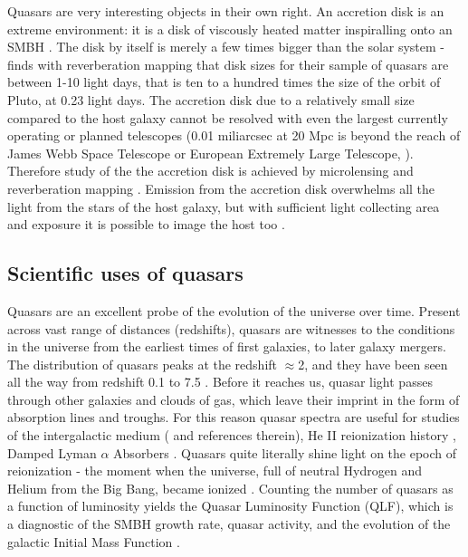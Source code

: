 \documentclass[modern]{aastex62}
\begin{document}
Quasars are very interesting objects in their own right. An accretion disk is an extreme environment: it is a disk of viscously heated matter inspiralling onto an SMBH \citep{ruan2017}. The disk by itself is merely a few times bigger than the solar system - \cite{mudd2017} finds with reverberation  mapping that disk sizes for their sample of quasars are between 1-10 light days, that is ten to a hundred times the size of the orbit of Pluto, at 0.23 light days. 
The accretion disk due to a relatively small size compared to the host galaxy cannot be resolved with even the largest currently operating or planned telescopes (0.01 miliarcsec at 20 Mpc is beyond the reach of James Webb Space Telescope or European Extremely Large Telescope, \cite{gardner2006,dioaliti2015}). Therefore study of the the accretion disk is achieved by microlensing \citep{agol1999, jimenez2012} and reverberation mapping \citep{jiang2017, mudd2017}.  Emission from the accretion disk overwhelms all the light from the stars of the host galaxy, but with sufficient light collecting area and exposure it is possible to image the host too \citep{hutchings2002,kotilainen2013, falomo2014, liuzzo2016, bayliss2017}. 

\subsection{Scientific uses of quasars}
Quasars are an excellent probe of the evolution of the universe over time. Present across vast range of distances (redshifts), quasars are witnesses to the conditions in the universe from the earliest times of first galaxies, to later galaxy mergers.  The distribution of quasars peaks at the redshift $\approx$2, and they have been seen all the way from redshift 0.1 to 7.5 \citep{paris2017, banados2018}. Before it reaches us, quasar light passes through other galaxies and clouds of gas, which leave their imprint  in the form of absorption lines and troughs.  For this reason quasar spectra are useful  for studies of the intergalactic medium (\cite{prochaska2014} and references therein),  He II reionization history \citep{khrykin2017}, Damped Lyman $\alpha$ Absorbers \citep{wolfe2005,murphy2016,parks2018}.  Quasars quite literally shine light on the epoch of reionization - the moment when the universe, full of neutral Hydrogen and Helium from the Big Bang, became ionized \citep{glikman2011, masters2012, ross2013}. Counting the number of quasars as a function of luminosity yields the Quasar Luminosity Function (QLF), which is a diagnostic of the SMBH growth rate, quasar activity, and the evolution of the galactic Initial Mass Function \citep{schawinski2012,mcgreer2013,alsayyad2016}. 
\end{document}
